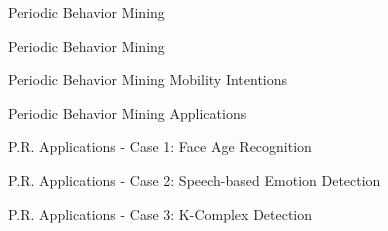 \documentclass[
 size=14pt,
 paper=smartboard,  %
 mode=present, 		%
 display=slides, 	%
 style=tuliplab,  	%
 pauseslide,
 fleqn,leqno]{powerdot}
\begin{document}
\begin{slide}[toc=,bm=]{Periodic Behavior Mining}


\end{slide}


\begin{slide}[toc=,bm=]{Periodic Behavior Mining}


\end{slide}


\begin{slide}[toc=,bm=]{Periodic Behavior Mining Mobility Intentions}


\end{slide}


\begin{slide}[toc=,bm=]{Periodic Behavior Mining Applications}


\end{slide}


\begin{slide}[toc=,bm=]{P.R. Applications - Case 1: Face Age Recognition}


\end{slide}


\begin{slide}[toc=,bm=]{P.R. Applications - Case 2: Speech-based Emotion Detection}


\end{slide}


\begin{slide}[toc=,bm=]{P.R. Applications - Case 3: K-Complex Detection}


\end{slide}
\end{document}
